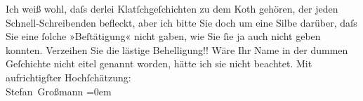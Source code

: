 \begin{ledgroupsized}[t]{13cm}
           \pstart
           Ich weiß wohl, daſs derlei Klatſchgeſchichten zu dem Koth gehören, der jeden
                    Schnell-Schreibenden befleckt, aber ich bitte Sie doch um eine Silbe darüber,
                    daſs Sie eine ſolche »Beſtätigung« nicht gaben, wie Sie ſie ja auch nicht geben
                    konnten.\pend
           \pstart
           Verzeihen Sie die lästige Behelligung!! Wäre Ihr Name in der dummen Geſchichte
                    nicht eitel genannt worden, hätte ich sie nicht beachtet.\pend
           \pstart
           Mit aufrichtigſter Hochſchätzung:{\\[\baselineskip]}\spacefill\mbox{Stefan Großmann}\pend
           \leftskip=0em{}
         
         \endnumbering{}\end{ledgroupsized}  \newcommand{\dateiname}{L02005}\newcommand{\titel}{Stefan Großmann an Arthur Schnitzler, [7.] 2. 1911}\newcommand{\editorInnen}{Martin Anton Müller und Gerd-Hermann Susen}
      